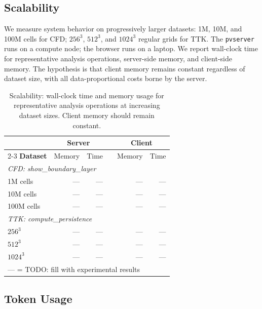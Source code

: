 \documentclass{vgtc}                          %
\begin{document}
\subsection{Scalability}

We measure system behavior on progressively larger datasets: 1M, 10M, and 100M
cells for CFD; $256^3$, $512^3$, and $1024^3$ regular grids for TTK.
The \texttt{pvserver} runs on a compute node; the browser runs on a laptop.
We report wall-clock time for representative analysis operations, server-side
memory, and client-side memory.
The hypothesis is that client memory remains constant regardless of dataset
size, with all data-proportional costs borne by the server.

\begin{table}[tb]
  \caption{Scalability: wall-clock time and memory usage for representative
  analysis operations at increasing dataset sizes. Client memory should remain
  constant.}
  \label{tab:scalability}
  \centering
  \scriptsize
  \begin{tabular}{lrrrrr}
  \toprule
  & \multicolumn{2}{c}{\textbf{Server}} & & \multicolumn{2}{c}{\textbf{Client}} \\
  \cmidrule{2-3} \cmidrule{5-6}
  \textbf{Dataset} & Memory & Time & & Memory & Time \\
  \midrule
  \multicolumn{6}{l}{\textit{CFD: show\_boundary\_layer}} \\
  \quad 1M cells   & --- & --- & & --- & --- \\
  \quad 10M cells  & --- & --- & & --- & --- \\
  \quad 100M cells & --- & --- & & --- & --- \\
  \midrule
  \multicolumn{6}{l}{\textit{TTK: compute\_persistence}} \\
  \quad $256^3$    & --- & --- & & --- & --- \\
  \quad $512^3$    & --- & --- & & --- & --- \\
  \quad $1024^3$   & --- & --- & & --- & --- \\
  \bottomrule
  \multicolumn{6}{l}{\scriptsize --- = TODO: fill with experimental results} \\
  \end{tabular}
\end{table}

\subsection{Token Usage}
\end{document}
